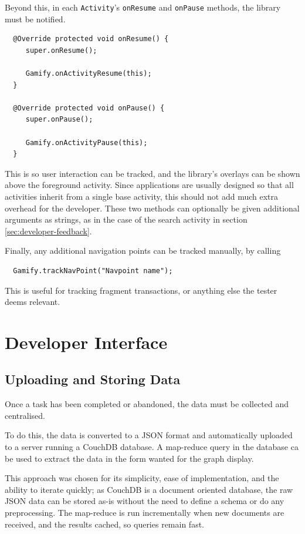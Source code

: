 Beyond this, in each \verb|Activity|'s \verb|onResume| and
\verb|onPause| methods, the library must be notified.

\begin{verbatim}
  @Override protected void onResume() {
     super.onResume();

     Gamify.onActivityResume(this);
  }

  @Override protected void onPause() {
     super.onPause();

     Gamify.onActivityPause(this);
  }
\end{verbatim}

This is so user interaction can be tracked, and the library's
overlays can be shown above the foreground activity. Since applications
are usually designed so that all activities inherit from a single
base activity, this should not add much extra overhead for the
developer. These two methods can optionally be given additional
arguments as strings, as in the case of the search activity in
section \ref{sec:developer-feedback}.

Finally, any additional navigation points can be tracked manually,
by calling

\begin{verbatim}
  Gamify.trackNavPoint("Navpoint name");
\end{verbatim}

This is useful for tracking fragment transactions, or anything else
the tester deems relevant.

\section{Developer Interface}

\subsection{Uploading and Storing Data}

Once a task has been completed or abandoned, the data must be
collected and centralised.

To do this, the data is converted to a JSON format and automatically
uploaded to a server running a CouchDB database. A map-reduce query
in the database ca be used to extract the data in the form wanted
for the graph display.

This approach was chosen for its simplicity, ease of implementation,
and the ability to iterate quickly; as CouchDB is a document oriented
database, the raw JSON data can be stored as-is without the need
to define a schema or do any preprocessing. The map-reduce is run
incrementally when new documents are received, and the results
cached, so queries remain fast.

